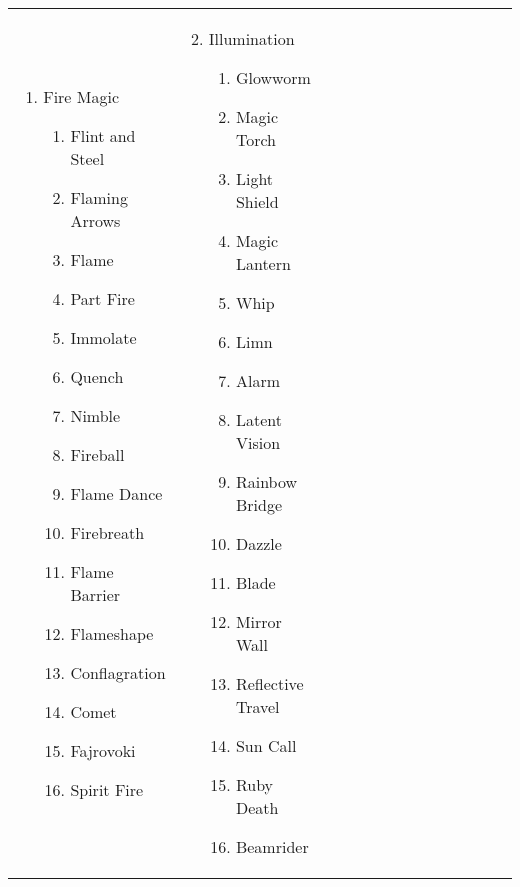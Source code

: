 \renewcommand{\labelenumii}{\arabic{enumii}.}
\begin{tabular}{@{} p{0.25\linewidth} p{0.25\linewidth} p{0.25\linewidth} p{0.25\linewidth}}
\begin{enumerate}
	\item Fire Magic
	\begin{enumerate}
		\item Flint and Steel
		\item Flaming Arrows
		\item Flame
		\item Part Fire
		\item Immolate
		\item Quench
		\item Nimble
		\item Fireball
		\item Flame Dance
		\item Firebreath
		\item Flame Barrier
		\item Flameshape
		\item Conflagration
		\item Comet
		\item Fajrovoki
		\item Spirit Fire
	\end{enumerate}
\end{enumerate} &
\begin{enumerate}
	\setcounter{enumi}{1}
	\item Illumination
	\begin{enumerate}
		\item Glowworm
		\item Magic Torch
		\item Light Shield
		\item Magic Lantern
		\item Whip
		\item Limn
		\item Alarm
		\item Latent Vision
		\item Rainbow Bridge
		\item Dazzle
		\item Blade
		\item Mirror Wall
		\item Reflective Travel
		\item Sun Call
		\item Ruby Death
		\item Beamrider
	\end{enumerate}
\end{enumerate} &

\end{tabular}
